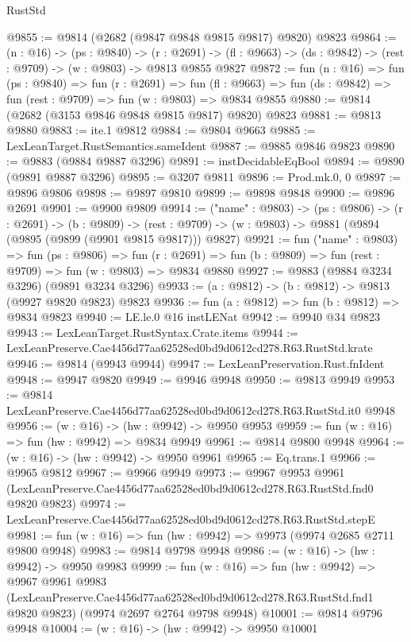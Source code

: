 \begin{lexlean}{RustStd}
\begin{coremodule}
@9855 := @9814 (@2682 (@9847 @9848 @9815 @9817) @9820) @9823
@9864 := (n : @16) ->
  (ps : @9840) ->
  (r : @2691) -> (fl : @9663) -> (ds : @9842) -> (rest : @9709) -> (w : @9803) -> @9813 @9855 @9827
@9872 := fun (n : @16) =>
  fun (ps : @9840) =>
  fun (r : @2691) =>
  fun (fl : @9663) => fun (ds : @9842) => fun (rest : @9709) => fun (w : @9803) => @9834 @9855
@9880 := @9814 (@2682 (@3153 @9846 @9848 @9815 @9817) @9820) @9823
@9881 := @9813 @9880
@9883 := ite.{1} @9812
@9884 := @9804 @9663
@9885 := LexLeanTarget.RustSemantics.sameIdent
@9887 := @9885 @9846 @9823
@9890 := @9883 (@9884 @9887 @3296)
@9891 := instDecidableEqBool
@9894 := @9890 (@9891 @9887 @3296)
@9895 := @3207 @9811
@9896 := Prod.mk.{0, 0}
@9897 := @9896 @9806
@9898 := @9897 @9810
@9899 := @9898 @9848
@9900 := @9896 @2691
@9901 := @9900 @9809
@9914 := ("name" : @9803) ->
  (ps : @9806) ->
  (r : @2691) ->
  (b : @9809) ->
  (rest : @9709) -> (w : @9803) -> @9881 (@9894 (@9895 (@9899 (@9901 @9815 @9817))) @9827)
@9921 := fun ("name" : @9803) =>
  fun (ps : @9806) =>
  fun (r : @2691) => fun (b : @9809) => fun (rest : @9709) => fun (w : @9803) => @9834 @9880
@9927 := @9883 (@9884 @3234 @3296) (@9891 @3234 @3296)
@9933 := (a : @9812) -> (b : @9812) -> @9813 (@9927 @9820 @9823) @9823
@9936 := fun (a : @9812) => fun (b : @9812) => @9834 @9823
@9940 := LE.le.{0} @16 instLENat
@9942 := @9940 @34 @9823
@9943 := LexLeanTarget.RustSyntax.Crate.items
@9944 := LexLeanPreserve.Cae4456d77aa62528ed0bd9d0612cd278.R63.RustStd.krate
@9946 := @9814 (@9943 @9944)
@9947 := LexLeanPreservation.Rust.fnIdent
@9948 := @9947 @9820
@9949 := @9946 @9948
@9950 := @9813 @9949
@9953 := @9814 LexLeanPreserve.Cae4456d77aa62528ed0bd9d0612cd278.R63.RustStd.it0 @9948
@9956 := (w : @16) -> (hw : @9942) -> @9950 @9953
@9959 := fun (w : @16) => fun (hw : @9942) => @9834 @9949
@9961 := @9814 @9800 @9948
@9964 := (w : @16) -> (hw : @9942) -> @9950 @9961
@9965 := Eq.trans.{1}
@9966 := @9965 @9812
@9967 := @9966 @9949
@9973 := @9967
    @9953
    @9961
    (LexLeanPreserve.Cae4456d77aa62528ed0bd9d0612cd278.R63.RustStd.fnd0 @9820 @9823)
@9974 := LexLeanPreserve.Cae4456d77aa62528ed0bd9d0612cd278.R63.RustStd.stepE
@9981 := fun (w : @16) => fun (hw : @9942) => @9973 (@9974 @2685 @2711 @9800 @9948)
@9983 := @9814 @9798 @9948
@9986 := (w : @16) -> (hw : @9942) -> @9950 @9983
@9999 := fun (w : @16) =>
  fun (hw : @9942) =>
  @9967
    @9961
    @9983
    (LexLeanPreserve.Cae4456d77aa62528ed0bd9d0612cd278.R63.RustStd.fnd1 @9820 @9823)
    (@9974 @2697 @2764 @9798 @9948)
@10001 := @9814 @9796 @9948
@10004 := (w : @16) -> (hw : @9942) -> @9950 @10001

\end{coremodule}
\end{lexlean}
